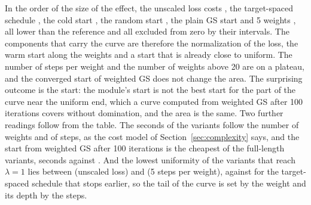 In the order of the size of the effect, the unscaled loss costs \ablRawDiff{}, the target-spaced schedule \ablTargetDiff{}, the cold start \ablColdDiff{}, the random start \ablStartRandDiff{}, the plain GS start \ablStartGsDiff{} and 5 weights \ablNLamFiveDiff{}, all lower than the reference and all excluded from zero by their intervals. The components that carry the curve are therefore the normalization of the loss, the warm start along the weights and a start that is already close to uniform. The number of steps per weight and the number of weights above 20 are
on a plateau, and the converged start of weighted GS does not change the area. The surprising outcome is the start: the module's start is not the best start for the part of the curve near the uniform end, which a curve computed from weighted GS after 100 iterations covers without domination, and the area is the same.
Two further readings follow from the table. The seconds of the variants follow the number of weights and of steps, as the cost model of Section~\ref{sec:complexity} says, and the start from weighted GS after 100 iterations is the cheapest of the full-length variants, \ablStartGswHSec{} seconds against \ablDefaultSec{}.
And the lowest uniformity of the variants that reach $\lambda=1$ lies between \ablRawUMin{} (unscaled loss) and \ablCgFiveUMin{} (5 steps per weight), against \ablTargetUMin{} for the target-spaced schedule that stops earlier, so the tail of the curve is set by the weight and its depth by the steps.
